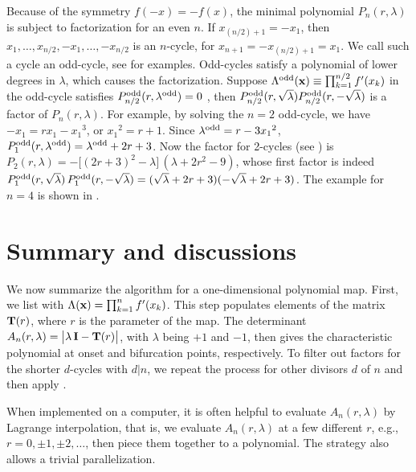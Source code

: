 \documentclass{ws-ijbc}
\begin{document}
Because of the symmetry $f(-x) = -f(x)$,
the minimal polynomial $P_n(r, \lambda)$
is subject to factorization for an even $n$.
%
If $x_{(n/2)+1} = -x_1$,
  then $x_1, \ldots, x_{n/2}, -x_1, \ldots, -x_{n/2}$
  is an $n$-cycle,
  for $x_{n+1} = - x_{(n/2)+1} = x_1$.
We call such a cycle an odd-cycle,
see  for examples.
%
Odd-cycles satisfy a polynomial
  of lower degrees in $\lambda$,
  which causes the factorization.
%
Suppose $\Lambda^{\mathrm{odd}}(\mathbf{x}) \equiv \prod_{k = 1}^{n/2} f'(x_k)$ in the odd-cycle
 satisfies $P_{n/2}^{\mathrm{odd}}(r, \lambda^{\mathrm{odd}}) = 0$
\big[where $\lambda^\odd$ is the value of $\Lambda^\odd(\vx)$,
and $\lambda^\odd = \pm\sqrt \lambda$\,\big],
then $P^{\mathrm{odd}}_{n/2}(r, \sqrt \lambda) P^{\mathrm{odd}}_{n/2}(r, -\sqrt \lambda)$
is a factor of $P_{n}(r, \lambda)$.
%
For example, by solving the $n = 2$ odd-cycle,
  we have $- x_1 = r x_1 - {x_1}^3$, or ${x_1}^2 = r + 1$.
Since $\lambda^{\mathrm{odd}} = r - 3 {x_1}^2$,
$P^{\mathrm{odd}}_1(r, \lambda^{\mathrm{odd}}) = \lambda^{\mathrm{odd}} + 2 r + 3$.
%
Now the factor for 2-cycles (see )
  is
  $P_2(r,\lambda) = -\big[(2r+3)^2 - \lambda\big]\,(\lambda + 2r^2-9)$,
  whose first factor is indeed
  $P^{\mathrm{odd}}_1(r, \sqrt \lambda) \, P^{\mathrm{odd}}_1(r, -\sqrt \lambda)
   = (\sqrt \lambda + 2 r + 3)(-\sqrt \lambda + 2 r + 3)$.
%
The example for $n=4$ is shown in .




\section{\label{sec:end}Summary and discussions}


We now summarize the algorithm for a one-dimensional polynomial map.
%
First, we list   with $\Lambda(\mathbf{x}) = \prod_{k=1}^n f'(x_k)$.
This step populates elements of the matrix $\mathbf{T}(r)$,
where $r$ is the parameter of the map.
%
The determinant $A_n(r, \lambda) = \big|\lambda \, \mathbf{I} - \mathbf{T}(r)\big|$,
with $\lambda$ being $+1$ and $-1$, then gives the characteristic
polynomial at onset and bifurcation points, respectively.
%
To filter out factors for the shorter $d$-cycles with $d|n$,
  we repeat the process for other divisors $d$ of $n$
  and then apply .
%


When implemented on a computer,
it is often helpful to evaluate $A_n(r,\lambda)$ by Lagrange interpolation,
that is, we evaluate $A_n(r, \lambda)$ at a few different $r$,
e.g., $r = 0, \pm1, \pm2,\ldots$, then piece them together
to a polynomial.
The strategy also allows a trivial parallelization.
\end{document}
